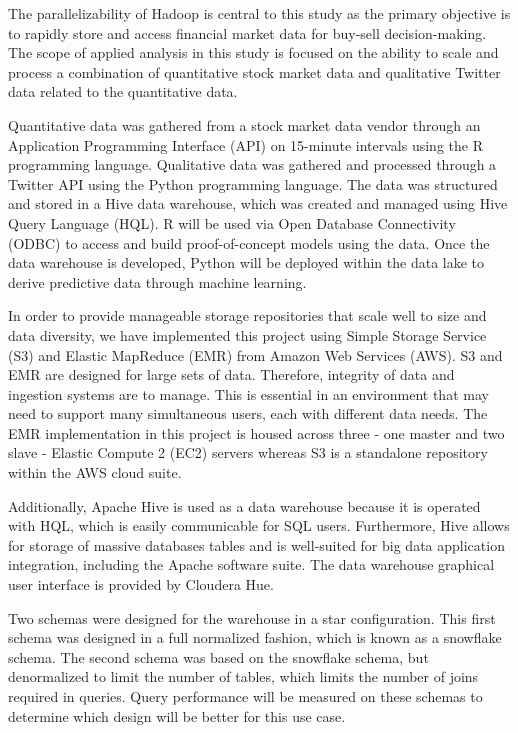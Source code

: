 \documentclass[journal]{IEEEtran}
\begin{document}
The parallelizability of Hadoop is central to this study as the primary
 objective is to rapidly store and access financial market data for 
 buy-sell decision-making. 
The scope of applied analysis in this study is focused on the ability to
 scale and process a combination of quantitative stock market data and
 qualitative Twitter data related to the quantitative data. 

Quantitative data was gathered from a stock market data vendor through an
 Application Programming Interface (API) on 15-minute intervals using the R
 programming language. 
Qualitative data was gathered and processed through a Twitter API
 using the Python programming language. 
The data was structured and stored in a Hive data warehouse, 
 which was created and managed using Hive Query Language (HQL).
R will be used via Open Database Connectivity (ODBC) to access and
 build proof-of-concept models using the data. 
Once the data warehouse is developed,
 Python will be deployed within the data lake to
 derive predictive data through machine learning.

In order to provide manageable storage repositories that scale well to size and
 data diversity, we have implemented this project using Simple Storage Service (S3)
 and Elastic MapReduce (EMR) from Amazon Web Services (AWS). 
S3 and EMR are designed for large sets of data. 
Therefore, integrity of data and ingestion systems are to manage. 
This is essential in an environment that may need to support many simultaneous users,
 each with different data needs. 
The EMR implementation in this project is housed across three 
 - one master and two slave - Elastic Compute 2 (EC2) servers 
 whereas S3 is a standalone repository within the AWS cloud suite.

Additionally, Apache Hive is used as a data warehouse 
 because it is operated with HQL, 
 which is easily communicable for SQL users. 
Furthermore, Hive allows for storage of massive databases tables and
 is well-suited for big data application integration, 
 including the Apache software suite. 
The data warehouse graphical user interface is provided by Cloudera Hue.

Two schemas were designed for the warehouse in a star configuration.
This first schema was designed in a full normalized fashion,
 which is known as a snowflake schema.
The second schema was based on the snowflake schema, 
 but denormalized to limit the number of tables, 
 which limits the number of joins required in queries.
Query performance will be measured on these schemas to determine
 which design will be better for this use case. 
\end{document}
